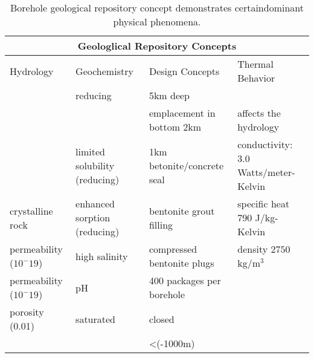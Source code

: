 %
\begin{table}[h!]
  \centering
  \footnotesize{
  \begin{tabular}{|l|l|l|l|}
    \multicolumn{4}{c}{\textbf{Geologlical Repository Concepts}}\\
    \hline
    Hydrology & Geochemistry & Design Concepts & Thermal Behavior \\ 
    \hline
    &reducing&5km deep&\\
    &&emplacement in bottom 2km&affects the hydrology\\
    &limited solubility (reducing)&1km betonite/concrete seal &conductivity: 3.0 Watts/meter-Kelvin\\
    crystalline rock&enhanced sorption (reducing)&bentonite grout filling&specific heat 790 J/kg-Kelvin\\
    permeability ($10^-19$)&high salinity&compressed bentonite plugs&density $2750 $kg/m$^3$\\
    permeability ($10^-19$)&pH&400 packages per borehole&\\
    porosity (0.01)&saturated&closed&\\
    &&<(-1000m)&\\
    \hline
  \end{tabular}
  \caption[Borehole Repository Features]{Borehole geological repository 
  concept demonstrates certaindominant physical phenomena. }
  \label{tab:borehole_tab}
  }
\end{table}


